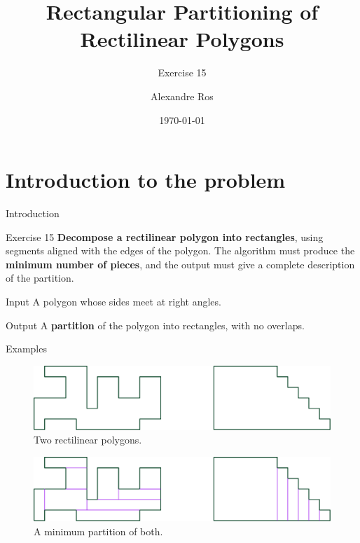 \documentclass{beamer}
\title{Rectangular Partitioning of Rectilinear Polygons}
\subtitle{Exercise 15}
\author{Alexandre Ros}
\date{\today}
\begin{document}
\frame{\titlepage}


\section{Introduction to the problem}

\begin{frame}{Introduction}
	\begin{block}{Exercise 15}
	\textbf{Decompose a rectilinear polygon into rectangles}, using segments aligned with the edges of the polygon.
The algorithm must produce the \textbf{minimum number of pieces}, and the output must give a
complete description of the partition.
	\end{block}
	\begin{block}{Input}
	A polygon whose sides meet at right angles.
	\end{block}  
	\begin{block}{Output}
	A \textbf{partition} of the polygon into rectangles, with no overlaps.
	\end{block}
\end{frame}

\begin{frame}{Examples}
\begin{figure}
\centering
  \includegraphics[width=.8\textwidth]{"./rect1.png"}
  \caption{Two rectilinear polygons.}
     \label{fig:question}
\end{figure}
\begin{figure}
\centering
  \includegraphics[width=.8\textwidth]{"./rec1sol.png"}
  \caption{A minimum partition of both.}
     \label{fig:question}
\end{figure}

\end{frame}
\end{document}
